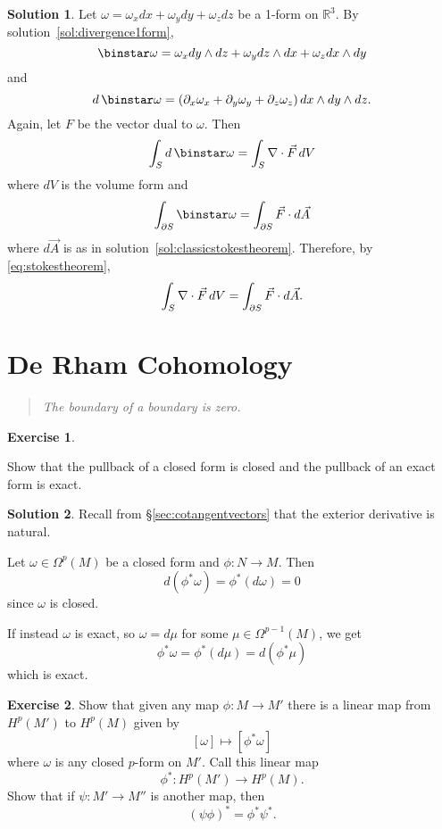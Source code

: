 \documentclass[11pt, a4paper]{report}
\theoremstyle{definition}
\newtheorem{exercise}{Exercise}[part]
\newtheorem{solution}{Solution}[part]
\newenvironment{ex}{\begin{exercise}}{\end{exercise}\pagebreak[1]}
\newenvironment{sol}{\begin{solution}}{\end{solution}\pagebreak[3]}
\newenvironment{epigraph}
    {\begin{quote}\small\itshape} %
    {\end{quote}\ignorespacesafterend\vspace{\parskip}}
\newcommand*{\op}[1]{\ensuremath\mathop{}\mathopen{}#1}
\renewcommand*{\d}{\op{d}}
\renewcommand*{\star}{\op{\binstar}\mathord{}}
\begin{document}
\begin{sol}

Let $\omega = \omega_x dx + \omega_y dy + \omega_z dz$ be a 1-form on $\mathbb{R}^3$. By solution~\ref{sol:divergence1form},
\[
    \star \omega = \omega_x dy \wedge dz + \omega_y dz \wedge dx + \omega_z dx \wedge dy
\]
and
\[
    d \star \omega = (\partial_x \omega_x + \partial_y \omega_y + \partial_z \omega_z) \d x \wedge dy \wedge dz.
\]
Again, let $F$ be the vector dual to $\omega$. Then
\[
    \int_S d \star \omega = \int_S \nabla \cdot \vec{F} \d V
\]
where $dV$ is the volume form and
\[
    \int_{\partial S} \star \omega = \int_{\partial S} \vec{F} \cdot d\vec{A}
\]
where $d\vec{A}$ is as in solution~\ref{sol:classicstokestheorem}.
Therefore, by \ref{eq:stokestheorem}, %
\[
    \int_S \nabla \cdot \vec{F} \d V = \int_{\partial S} \vec{F} \cdot d\vec{A}.
\]

\end{sol}

\section{De Rham Cohomology}

\begin{epigraph}
    The boundary of a boundary is zero.
\end{epigraph}

\begin{ex}\label{ex:pullbackclosedandexact}

Show that the pullback of a closed form is closed
and the pullback of an exact form is exact.

\end{ex}

\begin{sol}

Recall from \S\ref{sec:cotangentvectors} that the exterior derivative is natural.

Let $\omega \in \Omega^p(M)$ be a closed form and $\phi: N \to M$. Then
\[
    d (\phi^* \omega) = \phi^* (d \omega) = 0
\]
since $\omega$ is closed.

If instead $\omega$ is exact, so $\omega = d\mu$ for some $\mu \in \Omega^{p - 1}(M)$, we get
\[
    \phi^* \omega = \phi^* (d \mu) = d (\phi^* \mu)
\]
which is exact.

\end{sol}

\begin{ex}

Show that given any map $\phi: M \to M'$ there is a linear map from $H^p(M')$ to $H^p(M)$ given by
\[
    [\omega] \mapsto [\phi^* \omega]
\]
where $\omega$ is any closed $p$-form on $M'$. Call this linear map
\[
    \phi^*: H^p(M') \to H^p(M).
\]
Show that if $\psi: M' \to M''$ is another map, then
\[
    {(\psi \phi)}^* = \phi^* \psi^*.
\]

\end{ex}
\end{document}
